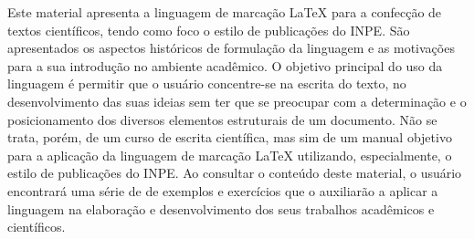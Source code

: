 
\begin{resumo}


\hypertarget{estilo:resumo}{} 

Este material apresenta a linguagem de marcação \LaTeX{} para a confecção de textos científicos, tendo como foco o estilo de publicações do INPE. São apresentados os aspectos históricos de formulação da linguagem e as motivações para a sua introdução no ambiente acadêmico. O objetivo principal do uso da linguagem é permitir que o usuário concentre-se na escrita do texto, no desenvolvimento das suas ideias sem ter que se preocupar com a determinação e o posicionamento dos diversos elementos estruturais de um documento. Não se trata, porém, de um curso de escrita científica, mas sim de um manual objetivo para a aplicação da linguagem de marcação \LaTeX{} utilizando, especialmente, o estilo de publicações do INPE. Ao consultar o conteúdo deste material, o usuário encontrará uma série de de exemplos e exercícios que o auxiliarão a aplicar a linguagem na elaboração e desenvolvimento dos seus trabalhos acadêmicos e científicos.

 
\end{resumo}
